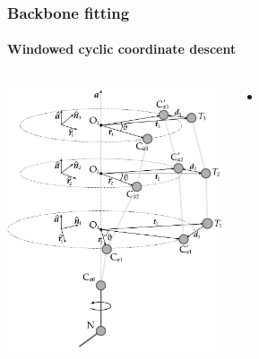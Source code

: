 \documentclass{beamer}
\begin{document}
\begin{frame}[t, fragile]
\frametitle{Backbone fitting} 
\framesubtitle{Windowed cyclic coordinate descent}
\begin{columns}[c]
\column{3in}
\begin{center}
\vspace*{-6mm}
\includegraphics[width=2.5in]{ccd}
\end{center}
\column{2.0in}
\begin{itemize}
\item 
\end{itemize}
\end{columns}
\end{frame}
\end{document}
